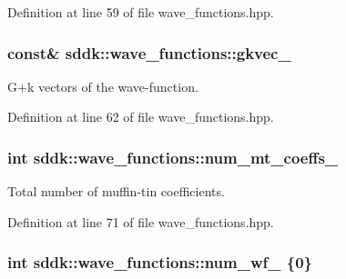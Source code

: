 Definition at line 59 of file wave\+\_\+functions.\+hpp.

\hypertarget{classsddk_1_1wave__functions_afe88ae4a135d1476e3a1a8e7f1b1f4bd}{}
\subsubsection[{gkvec\+\_\+}]{ const\& sddk\+::wave\+\_\+functions\+::gkvec\+\_\+\hspace{0.3cm}{\ttfamily [private]}}\label{classsddk_1_1wave__functions_afe88ae4a135d1476e3a1a8e7f1b1f4bd}


G+k vectors of the wave-\/function. 



Definition at line 62 of file wave\+\_\+functions.\+hpp.

\hypertarget{classsddk_1_1wave__functions_a03d0c959aba40ede728a48265e5f5614}{}
\subsubsection[{num\+\_\+mt\+\_\+coeffs\+\_\+}]{\setlength{\rightskip}{0pt plus 5cm}int sddk\+::wave\+\_\+functions\+::num\+\_\+mt\+\_\+coeffs\+\_\+\hspace{0.3cm}{\ttfamily [private]}}\label{classsddk_1_1wave__functions_a03d0c959aba40ede728a48265e5f5614}


Total number of muffin-\/tin coefficients. 



Definition at line 71 of file wave\+\_\+functions.\+hpp.

\hypertarget{classsddk_1_1wave__functions_aaf6c5919b9e7f96cf471af81bcf5e5cf}{}
\subsubsection[{num\+\_\+wf\+\_\+}]{\setlength{\rightskip}{0pt plus 5cm}int sddk\+::wave\+\_\+functions\+::num\+\_\+wf\+\_\+ \{0\}\hspace{0.3cm}{\ttfamily [private]}}\label{classsddk_1_1wave__functions_aaf6c5919b9e7f96cf471af81bcf5e5cf}


